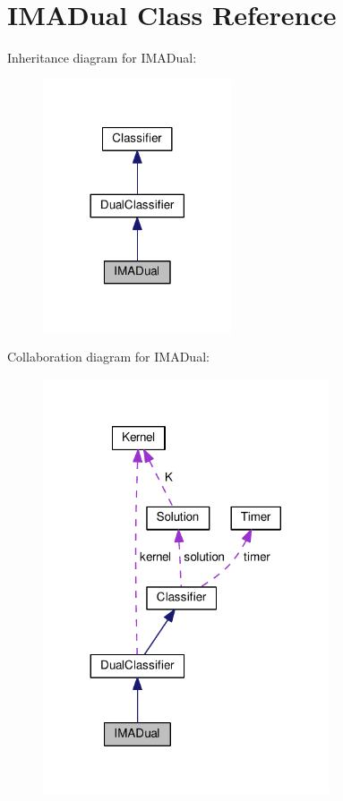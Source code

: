 \hypertarget{class_i_m_a_dual}{}\section{I\+M\+A\+Dual Class Reference}
\label{class_i_m_a_dual}


Inheritance diagram for I\+M\+A\+Dual\+:
\nopagebreak
\begin{figure}[H]
\begin{center}
\leavevmode
\includegraphics[width=158pt]{class_i_m_a_dual__inherit__graph}
\end{center}
\end{figure}


Collaboration diagram for I\+M\+A\+Dual\+:
\nopagebreak
\begin{figure}[H]
\begin{center}
\leavevmode
\includegraphics[width=239pt]{class_i_m_a_dual__coll__graph}
\end{center}
\end{figure}
